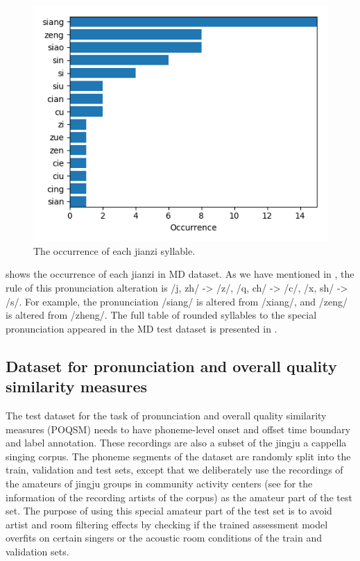\begin{figure}[ht!]
\includegraphics[width=\textwidth]{figs/dstats/occurrence_jianzi.png}
\caption{The occurrence of each jianzi syllable.}
\label{fig:ch4:occurrence_jianzi}
\end{figure}

 shows the occurrence of each jianzi in MD dataset. As we have mentioned in , the rule of this pronunciation alteration is /j, zh/ -> /z/, /q, ch/ -> /c/, /x, sh/ -> /s/. For example, the pronunciation /siang/ is altered from /xiang/, and /zeng/ is altered from /zheng/. The full table of rounded syllables to the special pronunciation appeared in the MD test dataset is presented in .

\subsection{Dataset for pronunciation and overall quality similarity measures}\label{sec:ch4:poqsm_dataset}

The test dataset for the task of pronunciation and overall quality similarity measures (POQSM) needs to have phoneme-level onset and offset time boundary and label annotation. These recordings are also a subset of the jingju a cappella singing corpus. The phoneme segments of the dataset are randomly split into the train, validation and test sets, except that we deliberately use the recordings of the amateurs of jingju groups in community activity centers (see  for the information of the recording artists of the corpus) as the amateur part of the test set. The purpose of using this special amateur part of the test set is to avoid artist and room filtering effects by checking if the trained assessment model overfits on certain singers or the acoustic room conditions of the train and validation sets.


